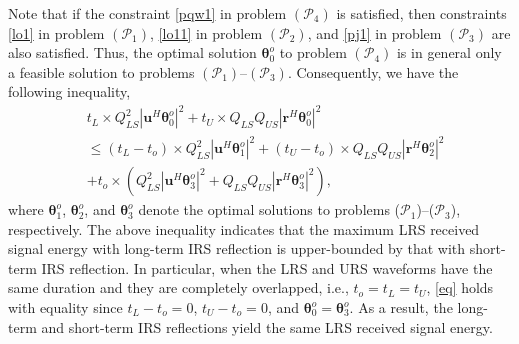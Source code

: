 \documentclass[10pt,final,doublecolumn]{IEEEtran}
\begin{document}
Note that if the constraint \eqref{pqw1} in problem $(\mathcal{P}_4)$ is satisfied, then constraints \eqref{lo1} in problem $(\mathcal{P}_1)$, \eqref{lo11} in problem $(\mathcal{P}_2)$, and \eqref{pj1} in problem $(\mathcal{P}_3)$ are also satisfied. Thus, the optimal solution $\boldsymbol{\theta}_0^o$ to problem $(\mathcal{P}_4)$ is in general only a feasible solution to problems $(\mathcal{P}_1)$--$(\mathcal{P}_3)$. Consequently, we have the following inequality,
\begin{align}\label{eq}
&t_L\times{{Q_{LS}^2}|{\mathbf{u}}^H
\boldsymbol{\theta}_0^o|^2}+t_U\times{{Q_{LS}Q_{US}}|{\mathbf{r}}^H
\boldsymbol{\theta}_0^o|^2}\nonumber\\
&\leq (t_L-t_o)\times{{Q_{LS}^2}|{\mathbf{u}}^H
\boldsymbol{\theta}_1^o|^2}+(t_U-t_o)\times{{Q_{LS}Q_{US}}|{\mathbf{r}}^H
\boldsymbol{\theta}_2^o|^2} \nonumber\\
& + t_o\times ({{Q_{LS}^2}|{\mathbf{u}}^H
\boldsymbol{\theta}_3^o|^2}+{{Q_{LS}Q_{US}}|{\mathbf{r}}^H
\boldsymbol{\theta}_3^o|^2}),
\end{align}
where $\boldsymbol{\theta}_{1}^o$, $\boldsymbol{\theta}_{2}^o$, and $\boldsymbol{\theta}_{3}^o$ denote the optimal solutions to problems ($\mathcal{P}_1$)--($\mathcal{P}_3$), respectively. The above inequality indicates that the maximum LRS received signal energy with long-term IRS reflection is upper-bounded by that with short-term IRS reflection. In particular, when the LRS and URS waveforms have the same duration and they are completely overlapped, i.e., $t_o=t_L=t_U$, \eqref{eq} holds with equality since $t_L-t_o=0$, $t_U-t_o=0$, and  $\boldsymbol{\theta}_0^o=\boldsymbol{\theta}_3^o$. As a result, the long-term and short-term IRS reflections yield the same LRS received signal energy.
\end{document}
